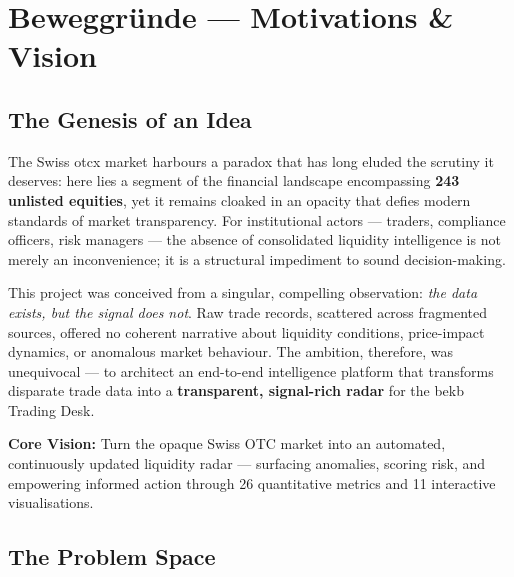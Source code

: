 \documentclass[
  11pt,
  a4paper,
  twoside,
  openany
]{report}
\begin{document}
\tableofcontents
\clearpage
\listoftables
\clearpage

\setcounter{page}{1}

\chapter{Beweggründe — Motivations \& Vision}
\label{ch:beweggruende}

\section{The Genesis of an Idea}

The Swiss \gls{otcx} market harbours a paradox that has long eluded the scrutiny it deserves: here lies a segment of the financial landscape encompassing \textbf{243 unlisted equities}, yet it remains cloaked in an opacity that defies modern standards of market transparency.  For institutional actors — traders, compliance officers, risk managers — the absence of consolidated liquidity intelligence is not merely an inconvenience; it is a structural impediment to sound decision-making.

This project was conceived from a singular, compelling observation: \emph{the data exists, but the signal does not}.  Raw trade records, scattered across fragmented sources, offered no coherent narrative about liquidity conditions, price-impact dynamics, or anomalous market behaviour.  The ambition, therefore, was unequivocal — to architect an end-to-end intelligence platform that transforms disparate trade data into a \textbf{transparent, signal-rich radar} for the \gls{bekb} Trading Desk.

\begin{insightbox}
\textbf{Core Vision:}\; Turn the opaque Swiss OTC market into an automated, continuously updated liquidity radar — surfacing anomalies, scoring risk, and empowering informed action through 26 quantitative metrics and 11 interactive visualisations.
\end{insightbox}

\section{The Problem Space}
\end{document}
